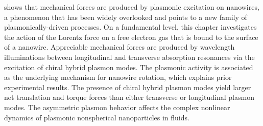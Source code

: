 shows that mechanical forces are produced by plasmonic excitation on nanowires, a phenomenon that has been widely overlooked and points to a new family of plasmonically-driven processes. On a fundamental level, this chapter investigates the action of the Lorentz force on a free electron gas that is bound to the surface of a nanowire. Appreciable mechanical forces are produced by wavelength illuminations between longitudinal and transverse absorption resonances via the excitation of chiral hybrid plasmon modes. The plasmonic activity is associated as the underlying mechanism for nanowire rotation, which explains prior experimental results. The presence of chiral hybrid plasmon modes yield larger net translation and torque forces than either transverse or longitudinal plasmon modes. The asymmetric plasmon behavior affects the complex nonlinear dynamics of plasmonic nonspherical nanoparticles in fluids.
